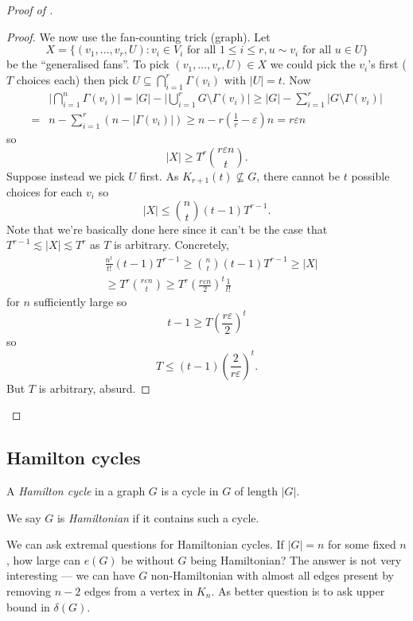 \documentclass[a4paper]{article}
\begin{document}
\begin{proof}[Proof of ]
\begin{proof}
  We now use the fan-counting trick (graph). Let
  \[
    X = \{(v_1, \dots, v_r, U): v_i \in V_i \text{ for all } 1 \leq i \leq r, u \sim v_i \text{ for all } u \in U\}
  \]
  be the ``generalised fans''. To pick \((v_1, \dots, v_r, U) \in X\) we could pick the \(v_i\)'s first (\(T\) choices each) then pick \(U \subseteq \bigcap_{i = 1}^r \Gamma(v_i)\) with \(|U| = t\). Now
  \begin{align*}
    &\big| \bigcap_{i = 1}^n \Gamma(v_i) \big| = |G| - \big| \bigcup_{i = 1}^r G \setminus \Gamma(v_i) \big| \geq |G| - \sum_{i = 1}^r |G \setminus \Gamma(v_i)| \\
    =& n - \sum_{i = 1}^r (n - |\Gamma(v_i)|) \geq n - r (\frac{1}{r} - \varepsilon) n = r \varepsilon n
  \end{align*}
  so
  \[
    |X| \geq T^r \binom{r \varepsilon n}{t}.
  \]
  Suppose instead we pick \(U\) first. As \(K_{r + 1}(t) \nsubseteq G\), there cannot be \(t\) possible choices for each \(v_i\) so
  \[
    |X| \leq \binom{n}{t} (t - 1) T^{r - 1}.
  \]
  Note that we're basically done here since it can't be the case that \(T^{r - 1} \lesssim |X| \lesssim T^r\) as \(T\) is arbitrary. Concretely,
  \begin{align*}
    &\frac{n^t}{t!} (t - 1) T^{r - 1}
      \geq \binom{n}{t} (t - 1) T^{r - 1}
      \geq |X| \\
    & \geq T^r \binom{r\varepsilon n}{t}
      \geq T^r (\frac{r \varepsilon n}{2})^t \frac{1}{t!}
  \end{align*}
  for \(n\) sufficiently large so
  \[
    t - 1 \geq T (\frac{r\varepsilon}{2})^t
  \]
  so
  \[
    T \leq (t - 1) (\frac{2}{r \varepsilon})^t.
  \]
  But \(T\) is arbitrary, absurd.
\end{proof}
\end{proof}

\subsection{Hamilton cycles}

\begin{definition}
  A \emph{Hamilton cycle} in a graph \(G\) is a cycle in \(G\) of length \(|G|\).

  We say \(G\) is \emph{Hamiltonian} if it contains such a cycle.
\end{definition}

We can ask extremal questions for Hamiltonian cycles. If \(|G| = n\) for some fixed \(n\), how large can \(e(G)\) be without \(G\) being Hamiltonian? The answer is not very interesting --- we can have \(G\) non-Hamiltonian with almost all edges present by removing \(n - 2\) edges from a vertex in \(K_n\). As better question is to ask upper bound in \(\delta(G)\).
\end{document}
